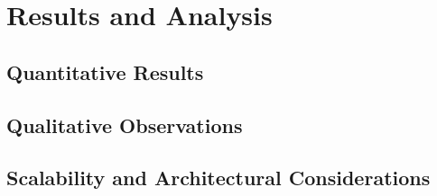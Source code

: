 \chapter{Results and Analysis}
\label{ch06:resultsandanalysis}

\section{Quantitative Results}
\label{ch06:resultsandanalysis:quantitativeresults}

\section{Qualitative Observations}
\label{ch06:resultsandanalysis:qualitativeobservations}

\section{Scalability and Architectural Considerations}
\label{ch06:resultsandanalysis:scalabilityconsiderations}